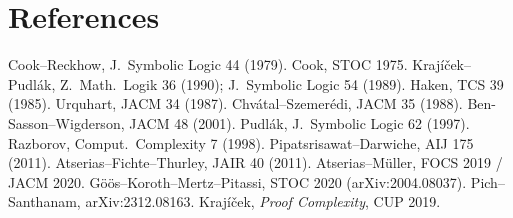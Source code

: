 \documentclass[11pt]{article}
\theoremstyle{definition}
\theoremstyle{remark}
\begin{document}
\section*{References}
Cook--Reckhow, J.\ Symbolic Logic 44 (1979). Cook, STOC 1975. Kraj\'i\v{c}ek--Pudl\'ak, Z.\ Math.\ Logik 36 (1990);
J.\ Symbolic Logic 54 (1989). Haken, TCS 39 (1985). Urquhart, JACM 34 (1987). Chv\'atal--Szemer\'edi, JACM 35 (1988).
Ben-Sasson--Wigderson, JACM 48 (2001). Pudl\'ak, J.\ Symbolic Logic 62 (1997). Razborov, Comput.\ Complexity 7 (1998).
Pipatsrisawat--Darwiche, AIJ 175 (2011). Atserias--Fichte--Thurley, JAIR 40 (2011). Atserias--M\"uller, FOCS 2019 / JACM 2020.
G\"o\"os--Koroth--Mertz--Pitassi, STOC 2020 (arXiv:2004.08037). Pich--Santhanam, arXiv:2312.08163.
Kraj\'i\v{c}ek, \emph{Proof Complexity}, CUP 2019.
\end{document}
